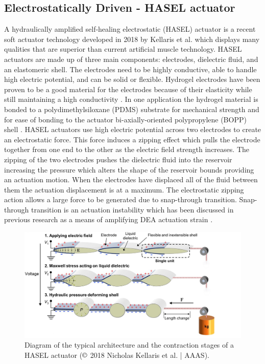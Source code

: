 \subsection{Electrostatically Driven - HASEL actuator}
\label{subsec:hasel-actuator}
A hydraulically amplified self‐healing electrostatic (HASEL) actuator is a recent soft actuator technology developed in 2018 by Kellaris et al.\citep{Kellaris2018} which displays many qualities that are superior than current artificial muscle technology. HASEL actuators are made up of three main components: electrodes, dielectric fluid, and an elastomeric shell. The electrodes need to be highly conductive, able to handle high electric potential, and can be solid or flexible. Hydrogel electrodes have been proven to be a good material for the electrodes because of their elasticity while still maintaining a high conductivity \citep{Acome2018}. In one application the hydrogel material is bonded to a polydimethylsiloxane (PDMS) substrate for mechanical strength and for ease of bonding to the actuator bi-axially-oriented polypropylene (BOPP) shell \citep{Kellaris2018,Yuk2016}. HASEL actuators use high electric potential across two electrodes to create an electrostatic force. This force induces a zipping effect which pulls the electrode together from one end to the other as the electric field strength increases. The zipping of the two electrodes pushes the dielectric fluid into the reservoir increasing the pressure which alters the shape of the reservoir bounds providing an actuation motion. When the electrodes have displaced all of the fluid between them the actuation displacement is at a maximum. The electrostatic zipping action allows a large force to be generated due to snap-through transition. Snap-through transition is an actuation instability which has been discussed in previous research as a means of amplifying DEA actuation strain \citep{Keplinger2012}. 
\begin{figure}[H]
	\centering
	\includegraphics[width=0.7\linewidth]{Figures/HASEL_actuator_crop.jpg}
	\caption{Diagram of the typical architecture and the contraction stages of a HASEL actuator \citep{Kellaris2018} ($\copyright$ 2018 Nicholas Kellaris et al. | AAAS).}
	\label{fig:Artificial Muscle_HASEL}
\end{figure}
